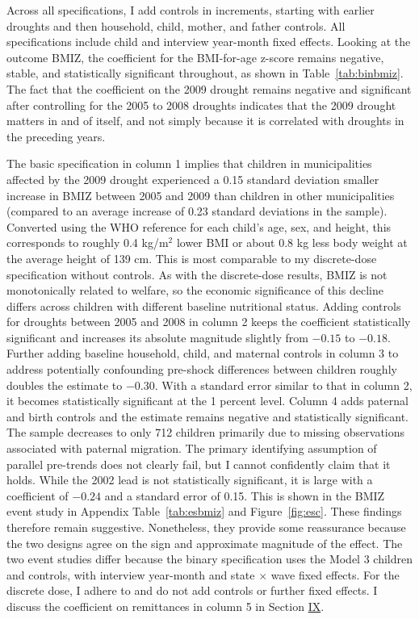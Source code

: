 Across all specifications, I add controls in increments, starting with earlier droughts and then household, child, mother, and father controls. All specifications include child and interview year-month fixed effects. Looking at the outcome BMIZ, the coefficient for the BMI-for-age z-score remains negative, stable, and statistically significant throughout, as shown in Table~\ref{tab:binbmiz}. The fact that the coefficient on the 2009 drought remains negative and significant after controlling for the 2005 to 2008 droughts indicates that the 2009 drought matters in and of itself, and not simply because it is correlated with droughts in the preceding years.


The basic specification in column 1 implies that children in municipalities affected by the 2009 drought experienced a 0.15 standard deviation smaller increase in BMIZ between 2005 and 2009 than children in other municipalities (compared to an average increase of 0.23 standard deviations in the sample). Converted using the WHO reference for each child's age, sex, and height, this corresponds to roughly 0.4 kg/m$^2$ lower BMI or about 0.8 kg less body weight at the average height of 139 cm. This is most comparable to my discrete-dose specification without controls. As with the discrete-dose results, BMIZ is not monotonically related to welfare, so the economic significance of this decline differs across children with different baseline nutritional status. Adding controls for droughts between 2005 and 2008 in column 2 keeps the coefficient statistically significant and increases its absolute magnitude slightly from $-0.15$ to $-0.18$. Further adding baseline household, child, and maternal controls in column 3 to address potentially confounding pre-shock differences between children roughly doubles the estimate to $-0.30$. With a standard error similar to that in column 2, it becomes statistically significant at the 1 percent level. Column 4 adds paternal and birth controls and the estimate remains negative and statistically significant. The sample decreases to only 712 children primarily due to missing observations associated with paternal migration. The primary identifying assumption of parallel pre-trends does not clearly fail, but I cannot confidently claim that it holds. While the 2002 lead is not statistically significant, it is large with a coefficient of $-0.24$ and a standard error of 0.15. This is shown in the BMIZ event study in Appendix Table~\ref{tab:esbmiz} and Figure~\ref{fig:esc}. These findings therefore remain suggestive. Nonetheless, they provide some reassurance because the two designs agree on the sign and approximate magnitude of the effect. The two event studies differ because the binary specification uses the Model 3 children and controls, with interview year-month and state $\times$ wave fixed effects. For the discrete dose, I adhere to \textcite{callawayDifferenceinDifferencesContinuousTreatment2024} and do not add controls or further fixed effects. I discuss the coefficient on remittances in column 5 in Section \hyperref[sec:IX]{IX}.

